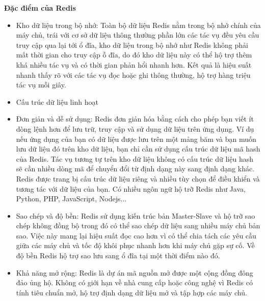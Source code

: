 \textbf{Đặc điểm của Redis}\\
\begin{itemize}
    \item Kho dữ liệu trong bộ nhớ: Toàn bộ dữ liệu Redis nằm trong bộ nhớ chính của máy chủ, trái với cơ sở dữ liệu thông thường phần lớn các tác vụ đều yêu cầu truy cập qua lại tới ổ đĩa, kho dữ liệu trong bộ nhớ như Redis không phải mất thời gian cho truy cập ỗ đĩa, do đó kho dữ liệu này có thể hộ trợ thêm khá nhiều tác vụ và có thời gian phản hổi nhanh hơn. Kết quả là hiệu suất nhanh thấy rõ với các tác vụ đọc hoặc ghi thông thường, hộ trợ hàng triệu tác vụ mỗi giây.
    \item Cấu trúc dữ liệu linh hoạt
    \item Đơn giản và dễ sử dụng: Redis đơn giản hóa bằng cách cho phép bạn viết ít dòng lệnh hơn để lưu trữ, truy cập và sử dụng dữ liệu trên ứng dụng. Ví dụ nếu ứng dụng của bạn có dữ liệu được lưu trên một mảng băm và bạn muốn lưu dữ liệu đó trên kho dữ liệu, bạn chỉ cần sử dụng cấu trúc dữ liệu mã hash của Redis. Tác vụ tương tự trên kho dữ liệu không có cấu trúc dữ liệu hash sẽ cần nhiều dòng mã để chuyển đổi từ định dạng này sang định dạng khác. Redis được trang bị cấu trúc dữ liệu riêng và nhiều tùy chọn để điều khiển và tương tác với dữ liệu của bạn. Có nhiều ngôn ngữ hộ trỡ Redis như Java, Python, PHP, JavaScript, Nodejs...
    \item Sao chép và độ bền: Redis sử dụng kiến trúc bản Master-Slave và hộ trỡ sao chép không đồng bộ trong đó có thể sao chép dữ liệu sang nhiều máy chủ bản sao. Việc này mang lại hiệu suất đọc cao hơn vì có thể chia tách các yêu cầu giữa các máy chủ và tốc độ khôi phục nhanh hơn khi máy chủ gặp sự cố. Về độ bền Redis hộ trợ sao lưu sang ổ đĩa tại một thời điểm nào đó.
    \item Khả năng mở rộng: Redis là dự án mã nguồn mở được một cộng đồng đông đảo ủng hộ. Không có giới hạn về nhà cung cấp hoặc công nghệ vì Redis có tính tiêu chuẩn mở, hộ trợ định dạng dữ liệu mở và tập hợp các máy chủ.
\end{itemize}

